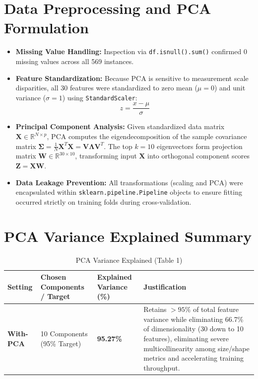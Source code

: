 \documentclass[12pt,a4paper]{article}
\begin{document}
\section{Data Preprocessing and PCA Formulation}
\begin{itemize}
    \item \textbf{Missing Value Handling:} Inspection via \texttt{df.isnull().sum()} confirmed 0 missing values across all 569 instances.
    \item \textbf{Feature Standardization:} Because PCA is sensitive to measurement scale disparities, all 30 features were standardized to zero mean ($\mu = 0$) and unit variance ($\sigma = 1$) using \texttt{StandardScaler}:
    \begin{equation}
    z = \frac{x - \mu}{\sigma}
    \end{equation}
    \item \textbf{Principal Component Analysis:} Given standardized data matrix $\mathbf{X} \in \mathbb{R}^{N \times p}$, PCA computes the eigendecomposition of the sample covariance matrix $\mathbf{\Sigma} = \frac{1}{N}\mathbf{X}^T\mathbf{X} = \mathbf{V}\mathbf{\Lambda}\mathbf{V}^T$. The top $k=10$ eigenvectors form projection matrix $\mathbf{W} \in \mathbb{R}^{30 \times 10}$, transforming input $\mathbf{X}$ into orthogonal component scores $\mathbf{Z} = \mathbf{X}\mathbf{W}$.
    \item \textbf{Data Leakage Prevention:} All transformations (scaling and PCA) were encapsulated within \texttt{sklearn.pipeline.Pipeline} objects to ensure fitting occurred strictly on training folds during cross-validation.
\end{itemize}

\section{PCA Variance Explained Summary}

\begin{table}[H]
\centering
\caption{PCA Variance Explained (Table 1)}
\label{tab:pca_variance}
\begin{tabular}{|p{2.5cm}|p{3.5cm}|p{2.5cm}|p{6cm}|}
\hline
\textbf{Setting} & \textbf{Chosen Components / Target} & \textbf{Explained Variance (\%)} & \textbf{Justification}\\ \hline
\textbf{With-PCA} & 10 Components (95\% Target) & \textbf{95.27\%} & Retains $>95\%$ of total feature variance while eliminating 66.7\% of dimensionality (30 down to 10 features), eliminating severe multicollinearity among size/shape metrics and accelerating training throughput.\\ \hline
\end{tabular}
\end{table}
\end{document}
